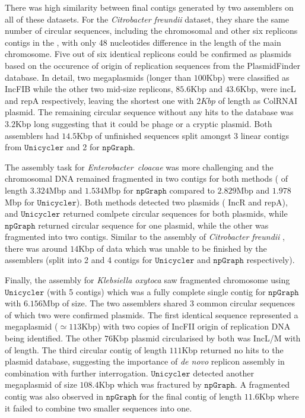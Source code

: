 \documentclass[10pt,letterpaper]{article}
\newcommand{\npgraph}{$\mathtt{npGraph}$}
\newcommand{\unicycler}{$\mathtt{Unicycler}$}
\begin{document}
There was high similarity between final contigs generated by two assemblers on all of these datasets.
For the \emph{Citrobacter freundii}  dataset, they share the same number of circular  sequences, including the chromosomal and other six replicons contigs in the , with only 48 nucleotides  difference in the length of the main chromosome. 
Five out of six identical replicons could be confirmed as plasmids based on the occurence of  origin of replication sequences from  the PlasmidFinder database.
In detail, two megaplasmids (longer than $100$Kbp) were classified as IncFIB while the other two mid-size replicons, $85.6$Kbp and $43.6$Kbp, were incL and repA respectively, leaving the shortest one with $2Kbp$ of length as ColRNAI plasmid.
The remaining circular sequence without any hits to the database was $3.2$Kbp long suggesting that it could be phage or a cryptic plasmid. 
Both assemblers had $14.5$Kbp of unfinished sequences split amongst 3 linear contigs from \unicycler{} and 2 for \npgraph{}.

The assembly task for \emph{Enterobacter~cloacae} was more challenging and the chromosomal DNA remained fragmented in two contigs for both methods ( of length $3.324$Mbp and $1.534$Mbp for \npgraph{} compared to $2.829$Mbp and $1.978$Mbp for \unicycler{}). Both methods detected two plasmids ( IncR and repA), and \unicycler{} returned comlpete circular sequences for both plasmids, while \npgraph{} returned circular sequence for one plasmid, while the other was fragmented into two contigs. Similar to the assembly of \emph{Citrobacter freundii} , there was around $14$Kbp of data which was unable to be finished by the assemblers (split into 2 and 4 contigs for \unicycler{} and \npgraph{} respectively). 

Finally, the assembly for \emph{Klebsiella oxytoca} saw fragmented chromosome using \unicycler{} (with 5 contigs) which was a fully complete single contig for \npgraph{} with $6.156$Mbp of size.
The two assemblers shared 3 common circular sequences of which two  were confirmed plasmids. 
The first identical sequence represented a megaplasmid ($\simeq 113$Kbp) with two copies of IncFII origin of replication DNA being identified.  The other $76$Kbp plasmid circularised by both was IncL/M with  of length.
The third circular contig of length $111$Kbp returned no hits to the plasmid database, suggesting the importance of \emph{de novo} replicon assembly in combination with further interrogation.
\unicycler{} detected another megaplasmid of size $108.4$Kbp which was fractured by \npgraph{}. 
A fragmented contig was also observed in \npgraph{} for the final contig of length $11.6$Kbp where it failed to combine two smaller sequences into one.
\end{document}
